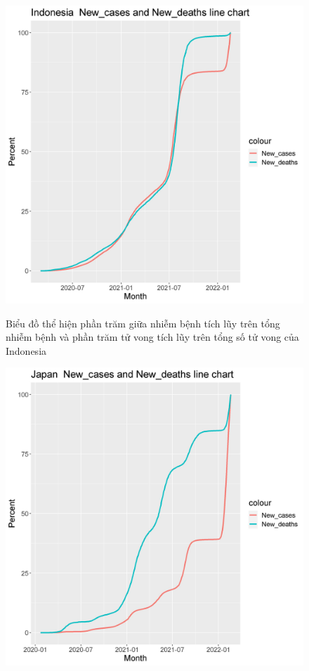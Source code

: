 \documentclass[a4paper]{article}
\theoremstyle{definition}
\begin{document}
\begin{enumerate}[i)]
\begin{enumerate}[1)]
\begin{figure}[h!]
            \includegraphics[scale = 0.8]{Images/IX/ix1Indonesia.jpeg}
            \label{fig:my_label}
        \end{figure}
        \begin{figure}[h!]
            \begin{center}
            \caption{Biểu đồ thể hiện phần trăm giữa nhiễm bệnh tích lũy trên tổng nhiễm bệnh và phần trăm tử vong tích lũy trên tổng số tử vong của Indonesia}
	        \end{center}
        \end{figure}
        \newpage
        \begin{figure}[h!]
            \centering
            \includegraphics[scale = 0.8]{Images/IX/ix1Japan.jpeg}

\end{figure}
\end{enumerate}
\end{enumerate}
\end{document}

